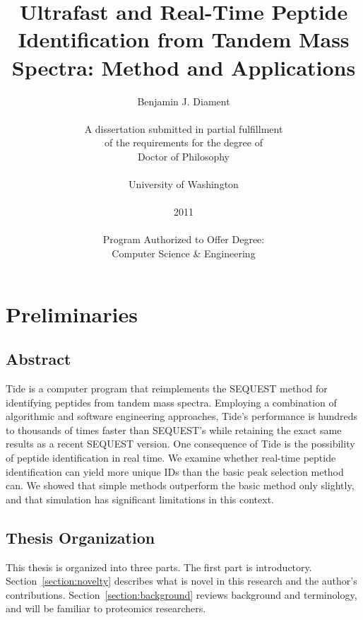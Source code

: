 \documentclass[12pt,twoside,openright]{report}
\author{{\Large Benjamin J. Diament}\\
\\
A dissertation submitted in partial fulfillment\\
of the requirements for the degree of\\
{\Large Doctor of Philosophy}\\
\\
University of Washington\\
\\
2011\\
\\
Program Authorized to Offer Degree:\\
Computer Science \& Engineering\\
}
\date{}
\title{Ultrafast and Real-Time Peptide Identification from Tandem Mass Spectra:
  Method and Applications}
\let\origdoublepage\cleardoublepage
\newcommand{\clearemptydoublepage}{
  \clearpage{\pagestyle{empty}\origdoublepage}
}
\let\cleardoublepage\clearemptydoublepage
\begin{document}
\maketitle

\cleardoublepage
\pagestyle{plain}
\setcounter{page}{1}
\tableofcontents

\newpage
{} \label{listoffig}
\listoffigures

\newpage
{} \label{listoftab}
\listoftables

\chapter{Preliminaries}
\pagestyle{myheadings}
\setcounter{page}{1}

\section{Abstract}

Tide is a computer program that reimplements the SEQUEST method for identifying
peptides from tandem mass spectra. Employing a combination of algorithmic and
software engineering approaches, Tide's performance is hundreds to thousands of
times faster than SEQUEST's while retaining the exact same results as a recent
SEQUEST version.  One consequence of Tide is the possibility of peptide
identification in real time. We examine whether real-time peptide identification
can yield more unique IDs than the basic peak selection method can. We showed
that simple methods outperform the basic method only slightly, and that 
simulation has significant limitations in this context.

\section{Thesis Organization}

This thesis is organized into three parts. The first part is introductory.
Section~\ref{section:novelty} describes what is novel in this research and
the author's contributions. Section~\ref{section:background} reviews
background and terminology, and will be familiar to proteomics researchers.
\end{document}
